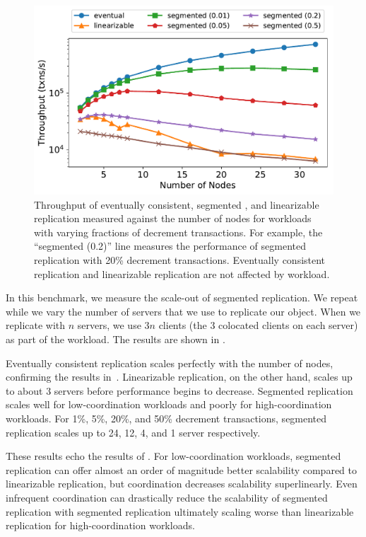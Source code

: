\begin{figure}[t]
  \centering
  \includegraphics[width=\columnwidth]{figures/throughput_vs_num_nodes_multi.pdf}
  \caption{%
    Throughput of eventually consistent, segmented \invariantconfluent{}, and
    linearizable replication measured against the number of nodes for workloads
    with varying fractions of decrement transactions. For example, the
    ``segmented (0.2)'' line measures the performance of segmented
    \invariantconfluent{} replication with 20\% decrement transactions.
    Eventually consistent replication and linearizable replication are not
    affected by workload.
  }
\end{figure}

\begin{benchmark}
  In this benchmark, we measure the scale-out of segmented
  \invariantconfluent{} replication. We repeat  while
  we vary the number of servers that we use to replicate our object. When we
  replicate with $n$ servers, we use $3n$ clients (the $3$ colocated clients on
  each server) as part of the workload. The results are shown in
  .

  Eventually consistent replication scales perfectly with the number of nodes,
  confirming the results in~\cite{bailis2014coordination}. Linearizable
  replication, on the other hand, scales up to about 3 servers before
  performance begins to decrease. Segmented \invariantconfluent{} replication
  scales well for low-coordination workloads and poorly for high-coordination
  workloads. For 1\%, 5\%, 20\%, and 50\% decrement transactions, segmented
  \invariantconfluent{} replication scales up to 24, 12, 4, and 1 server
  respectively.

  These results echo the results of . For
  low-coordination workloads, segmented \invariantconfluent{} replication can
  offer almost an order of magnitude better scalability compared to
  linearizable replication, but coordination decreases scalability
  superlinearly. Even infrequent coordination can drastically reduce the
  scalability of segmented \invariantconfluent{} replication with segmented
  \invariantconfluent{} replication ultimately scaling worse than linearizable
  replication for high-coordination workloads.
\end{benchmark}

